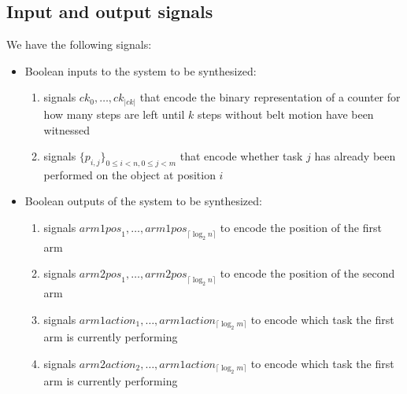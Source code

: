 \documentclass[a4paper,10pt]{IEEEtran}
\begin{document}
\subsection{Input and output signals}
%
\noindent We have the following signals:
\begin{itemize}
\item Boolean inputs to the system to be synthesized:
\begin{enumerate}
\item signals $\mathit{ck}_0, \ldots, \mathit{ck}_{|\mathit{ck}|}$ that encode the binary representation of a counter for how many steps are left until $k$ steps without belt motion have been witnessed
\item signals $\{\mathit{p}_{i,j} \}_{0 \leq i < n, 0 \leq j < m}$ that encode whether task $j$ has already been performed on the object at position $i$ 
\end{enumerate}
\item Boolean outputs of the system to be synthesized:
\begin{enumerate}
\item signals $\mathit{arm1pos}_1,  \ldots, \mathit{arm1pos}_{\lceil \log_2 n \rceil}$ to encode the position of the first arm
\item signals $\mathit{arm2pos}_1,  \ldots, \mathit{arm2pos}_{\lceil \log_2 n \rceil}$ to encode the position of the second arm
\item signals $\mathit{arm1action}_1,  \ldots, \mathit{arm1action}_{\lceil \log_2 m \rceil}$ to encode which task the first arm is currently performing
\item signals $\mathit{arm2action}_2,  \ldots, \mathit{arm1action}_{\lceil \log_2 m \rceil}$ to encode which task the first arm is currently performing
\end{enumerate}
\end{itemize}
\end{document}

